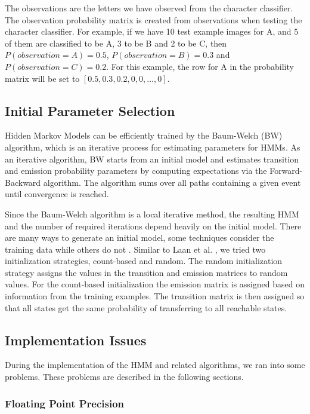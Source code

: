 The observations are the letters we have observed from the character classifier.
The observation probability matrix is created from observations when testing the character classifier.
For example, if we have 10 test example images for A, and 5 of them are classified to be A, 3 to be B and 2 to be C, then $P(observation=A)=0.5$, $P(observation=B)=0.3$ and $P(observation=C)=0.2$.
For this example, the row for A in the probability matrix will be set to $[0.5, 0.3, 0.2, 0, 0,...,0]$.

\subsection{Initial Parameter Selection}

Hidden Markov Models can be efficiently trained by the Baum-Welch (BW) algorithm, which is an iterative process for estimating parameters for HMMs. 
As an iterative algorithm, BW starts from an initial model and estimates transition and emission probability parameters by computing expectations via the Forward-Backward algorithm.
The algorithm sums over all paths containing a given event until convergence is reached.

Since the Baum-Welch algorithm is a local iterative method, the resulting HMM and the number of required iterations depend heavily on the initial model. 
There are many ways to generate an initial model, some techniques consider the training data while others do not \cite{Laan}.
Similar to Laan et al. \cite{Laan}, we tried two initialization strategies, count-based and random.
The random initialization strategy assigns the values in the transition and emission matrices to random values.
For the count-based initialization the emission matrix is assigned based on information from the training examples. The transition matrix is then assigned so that all states get the same probability of transferring to all reachable states.

\subsection{Implementation Issues}

During the implementation of the HMM and related algorithms, we ran into some problems. These problems are described in the following sections.

\subsubsection{Floating Point Precision}

